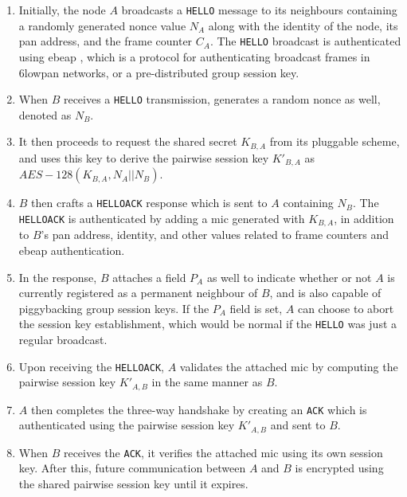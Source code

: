 \begin{enumerate}

\item  Initially, the node $A$ broadcasts a \texttt{HELLO} message to its neighbours containing a randomly generated nonce value $N_A$ along with the identity of the node, its \gls{pan} address, and the frame counter $C_A$. The \texttt{HELLO} broadcast is authenticated using \gls{ebeap} \cite{krentz20136lowpan}, which is a protocol for authenticating broadcast frames in \gls{6lowpan} networks, or a pre-distributed group session key.

\item When $B$ receives a \texttt{HELLO} transmission, generates a random nonce as well, denoted as $N_B$.

\item It then proceeds to request the shared secret $K_{B,A}$ from its pluggable scheme, and uses this key to derive the pairwise session key $K'_{B,A}$ as\\ $AES-128(K_{B,A}, N_A || N_B)$.

\item $B$ then crafts a \texttt{HELLOACK} response which is sent to $A$ containing $N_B$. The \texttt{HELLOACK} is authenticated by adding a \gls{mic} generated with $K_{B,A}$, in addition to $B$'s \gls{pan} address, identity, and other values related to frame counters and \gls{ebeap} authentication.

\item In the response, $B$ attaches a field $P_A$ as well to indicate whether or not $A$ is currently registered as a permanent neighbour of $B$, and is also capable of piggybacking group session keys. If the $P_A$ field is set, $A$ can choose to abort the session key establishment, which would be normal if the \texttt{HELLO} was just a regular broadcast.

\item  Upon receiving the \texttt{HELLOACK}, $A$ validates the attached \gls{mic} by computing the pairwise session key $K'_{A, B}$ in the same manner as $B$.

\item $A$ then completes the three-way handshake by creating an \texttt{ACK} which is authenticated using the pairwise session key $K'_{A, B}$ and sent to $B$.


\item  When $B$ receives the \texttt{ACK}, it verifies the attached \gls{mic} using its own session key. After this, future communication between $A$ and $B$ is encrypted using the shared pairwise session key until it expires.


\end{enumerate}

